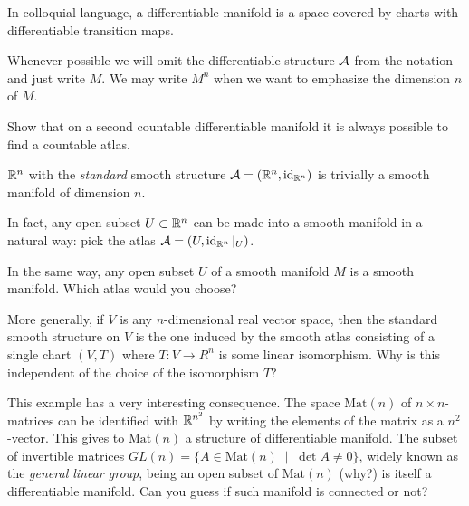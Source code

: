 In colloquial language, a differentiable manifold is a space covered by charts with differentiable transition maps.

Whenever possible we will omit the differentiable structure $\mathcal{A}$ from the notation and just write $M$.
We may write $M^n$ when we want to emphasize the dimension $n$ of $M$.

\begin{exercise}
  Show that on a second countable differentiable manifold it is always possible to find a countable atlas.
\end{exercise}

\begin{exercise}\label{exe:subsetsmanifolds}
  $\mathbb{R}^n$ with the \emph{standard} smooth structure $\mathcal{A}=(\mathbb{R}^n, \operatorname{id}_{\mathbb{R}^n})$ is trivially a smooth manifold of dimension $n$.

  In fact, any open subset $U\subset\mathbb{R}^n$ can be made into a smooth manifold in a natural way: pick the atlas $\mathcal{A}=(U, \operatorname{id}_{\mathbb{R}^n}|_U)$.

  In the same way, any open subset $U$ of a smooth manifold $M$ is a smooth manifold.
  Which atlas would you choose?

  More generally, if $V$ is any $n$-dimensional real vector space, then the standard smooth structure on $V$ is the one induced by the smooth atlas consisting of a single chart $(V, T)$ where $T: V \to R^n$ is some linear isomorphism.
  Why is this independent of the choice of the isomorphism $T$?

  This example has a very interesting consequence.
  The space $\mathrm{Mat}(n)$ of $n\times n$-matrices can be identified with $\mathbb{R}^{n^2}$ by writing the elements of the matrix as a $n^2$-vector.
  This gives to $\mathrm{Mat}(n)$ a structure of differentiable manifold.
  The subset of invertible matrices $GL(n) = \{ A \in \mathrm{Mat}(n) \;\mid\; \det A \neq 0\}$, widely known as the \emph{general linear group}, being an open subset of $\mathrm{Mat}(n)$ (why?) is itself a differentiable manifold.
  Can you guess if such manifold is connected or not?
\end{exercise}


